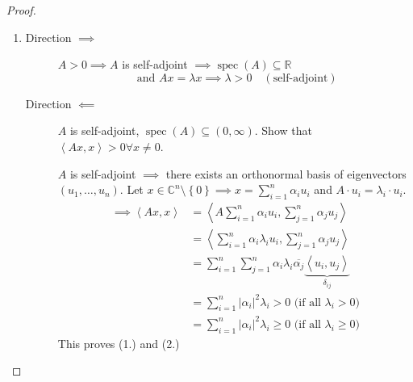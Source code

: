 \documentclass[a4paper]{article}
\numberwithin{lecref}{section}
\newcommand{\set}[1]{\left\{#1\right\}}
\newcommand{\angel}[1]{\left\langle#1\right\rangle}
\newcommand{\card}[1]{\left|#1\right|}
\begin{document}
\begin{proof}
  \begin{enumerate}
    \item
      \begin{description}
        \item[Direction $\implies$]
          $A > 0 \implies A$ is self-adjoint $\implies \operatorname{spec}(A) \subseteq \mathbb R$
          \[ \text{ and } Ax = \lambda x \implies \lambda > 0 \quad (\text{self-adjoint}) \]
        \item[Direction $\impliedby$]
          $A$ is self-adjoint, $\operatorname{spec}(A) \subseteq (0, \infty)$.
          Show that $\angel{Ax, x} > 0 \forall x \neq 0$.

          $A$ is self-adjoint $\implies$ there exists an orthonormal basis of eigenvectors $(u_1, \dots, u_n)$.
          Let $x \in \mathbb C^n \setminus \set{0} \implies x = \sum_{i=1}^n \alpha_i u_i$ and $A \cdot u_i = \lambda_i \cdot u_i$.
          \begin{align*}
            \implies \angel{Ax,x} &= \angel{A \sum_{i=1}^n \alpha_i u_i, \sum_{j=1}^n \alpha_j u_j} \\
              &= \angel{\sum_{i=1}^n \alpha_i \lambda_i u_i, \sum_{j=1}^n \alpha_j u_j} \\
              &= \sum_{i=1}^n \sum_{j=1}^n \alpha_i \lambda_i \overline{\alpha_j} \underbrace{\angel{u_i,u_j}}_{\delta_{ij}} \\
              &= \sum_{i=1}^n \card{\alpha_i}^2 \lambda_i > 0 \text{ (if all $\lambda_i > 0$)} \\
              &= \sum_{i=1}^n \card{\alpha_i}^2 \lambda_i \geq 0 \text{ (if all $\lambda_i \geq 0$)}
          \end{align*}
          This proves (1.) and (2.)
      \end{description}
    \end{enumerate}
\end{proof}
\end{document}
